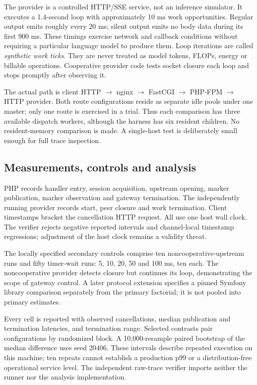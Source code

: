\documentclass[11pt,a4paper]{article}
\begin{document}
The provider is a controlled HTTP/SSE service, not an inference simulator. It executes a 1.4-second loop with approximately 10 ms work opportunities. Regular output emits roughly every 20 ms; silent output emits no body data during its first 900 ms. These timings exercise network and callback conditions without requiring a particular language model to produce them. Loop iterations are called \emph{synthetic work ticks}. They are never treated as model tokens, FLOPs, energy or billable operations. Cooperative provider code tests socket closure each loop and stops promptly after observing it.

The actual path is client HTTP $\rightarrow$ nginx $\rightarrow$ FastCGI $\rightarrow$ PHP-FPM $\rightarrow$ HTTP provider. Both route configurations reside as separate idle pools under one master; only one route is exercised in a trial. Thus each comparison has three available dispatch workers, although the harness has six resident children. No resident-memory comparison is made. A single-host test is deliberately small enough for full trace inspection.

\subsection{Measurements, controls and analysis}
PHP records handler entry, session acquisition, upstream opening, marker publication, marker observation and gateway termination. The independently running provider records start, peer closure and work termination. Client timestamps bracket the cancellation HTTP request. All use one host wall clock. The verifier rejects negative reported intervals and channel-local timestamp regressions; adjustment of the host clock remains a validity threat.

The locally specified secondary controls comprise ten noncooperative-upstream runs and fifty timer-wait runs: 5, 10, 20, 50 and 100 ms, ten each. The noncooperative provider detects closure but continues its loop, demonstrating the scope of gateway control. A later protocol extension specifies a pinned Symfony library comparison separately from the primary factorial; it is not pooled into primary estimates.

Every cell is reported with observed cancellations, median publication and termination latencies, and termination range. Selected contrasts pair configurations by randomized block. A 10,000-resample paired bootstrap of the median difference uses seed 20406. These intervals describe repeated execution on this machine; ten repeats cannot establish a production p99 or a distribution-free operational service level. The independent raw-trace verifier imports neither the runner nor the analysis implementation.
\end{document}

